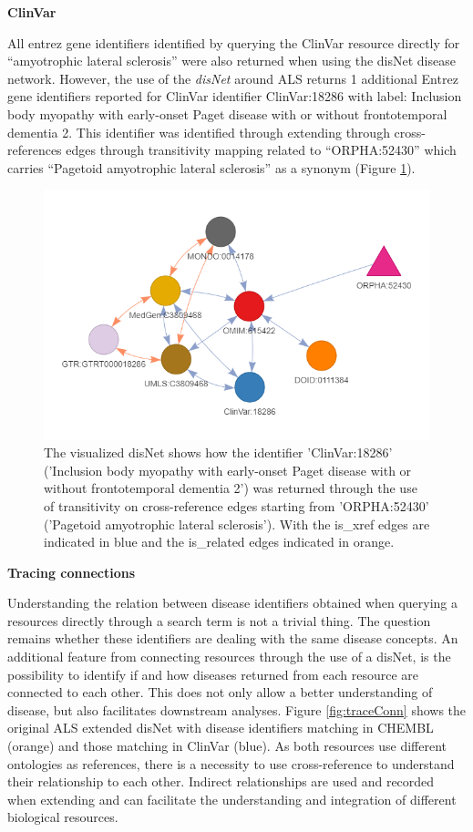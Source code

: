 \documentclass[9pt,a4paper,]{extarticle}
\begin{document}
\textbf{ClinVar}

All entrez gene identifiers identified by querying the ClinVar resource directly for ``amyotrophic lateral sclerosis'' were also returned when using the disNet disease network. However, the use of the \emph{disNet} around ALS returns 1 additional Entrez gene identifiers reported for ClinVar identifier ClinVar:18286 with label: Inclusion body myopathy with early-onset Paget disease with or without frontotemporal dementia 2. This identifier was identified through extending through cross-references edges through transitivity mapping related to ``ORPHA:52430'' which carries ``Pagetoid amyotrophic lateral sclerosis'' as a synonym (Figure \ref{fig:disnetALSclinvar}).

\begin{figure}

{\centering \includegraphics[width=0.5\linewidth]{fig/disNet_als_clinvar} 

}

\caption{The visualized disNet shows how the identifier 'ClinVar:18286' ('Inclusion body myopathy with early-onset Paget disease with or without frontotemporal dementia 2') was returned through the use of transitivity on cross-reference edges starting from 'ORPHA:52430' ('Pagetoid amyotrophic lateral sclerosis'). With the is\_xref edges are indicated in blue and the is\_related edges indicated in orange.}\label{fig:disnetALSclinvar}
\end{figure}

\textbf{Tracing connections}

Understanding the relation between disease identifiers obtained when querying a resources directly through a search term is not a trivial thing. The question remains whether these identifiers are dealing with the same disease concepts. An additional feature from connecting resources through the use of a disNet, is the possibility to identify if and how diseases returned from each resource are connected to each other. This does not only allow a better understanding of disease, but also facilitates downstream analyses. Figure \ref{fig:traceConn} shows the original ALS extended disNet with disease identifiers matching in CHEMBL (orange) and those matching in ClinVar (blue). As both resources use different ontologies as references, there is a necessity to use cross-reference to understand their relationship to each other. Indirect relationships are used and recorded when extending and can facilitate the understanding and integration of different biological resources.
\end{document}

